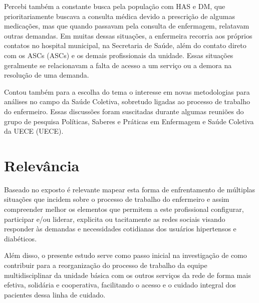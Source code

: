 Percebi também a constante busca pela população com \acrshort{HAS} e \acrshort{DM}, que prioritariamente buscava a consulta médica devido a prescrição de algumas medicações, mas que quando passavam pela consulta de enfermagem, relatavam outras demandas. Em muitas dessas situações, a enfermeira recorria aos próprios contatos no hospital municipal, na Secretaria de Saúde, além do contato direto com os \acrlong{ASCs} (\acrshort{ASCs}) e os demais profissionais da unidade. Essas situações geralmente se relacionavam a falta de acesso a um serviço ou a demora na resolução de uma demanda. 

Contou também para a escolha do tema o interesse em novas metodologias para análises no campo da Saúde Coletiva, sobretudo ligadas ao processo de trabalho do enfermeiro. Essas discussões foram suscitadas durante algumas reuniões do grupo de pesquisa Políticas, Saberes e Práticas em Enfermagem e Saúde Coletiva da \acrlong{UECE} (\acrshort{UECE}).  

\section{Relevância}
Baseado  no exposto é relevante mapear esta forma de enfrentamento de múltiplas situações que incidem sobre o processo de trabalho do enfermeiro e assim compreender melhor os elementos que permitem a este profissional configurar, participar e/ou liderar, explicita ou tacitamente as redes sociais visando responder às demandas e necessidades cotidianas dos usuários hipertensos e diabéticos. 

Além disso, o presente estudo serve como passo inicial na investigação de como contribuir para a reorganização do processo de trabalho da equipe multidisciplinar da unidade  básica com os outros serviços da rede de forma mais  efetiva, solidária e cooperativa, facilitando o acesso e o cuidado integral dos pacientes dessa linha de cuidado.